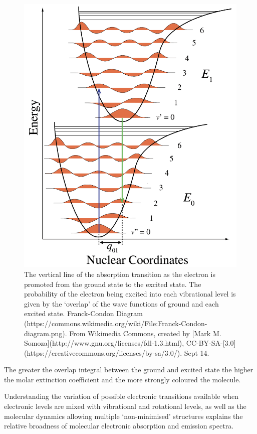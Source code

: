 \documentclass[
]{book}
\begin{document}
\begin{figure}

{\centering \includegraphics[width=0.6\linewidth]{images/FrankCondon} 

}

\caption{The vertical line of the absorption transition as the electron is promoted from the ground state to the excited state. The probability of the electron being excited into each vibrational level is given by the ‘overlap’ of the wave functions of ground and each excited state. Franck-Condon Diagram  (https://commons.wikimedia.org/wiki/File:Franck-Condon-diagram.png). From Wikimedia Commons, created by [Mark M. Somoza](http://www.gnu.org/licenses/fdl-1.3.html), CC-BY-SA-[3.0](https://creativecommons.org/licenses/by-sa/3.0/). Sept 14. }\label{fig:FrankCondon}
\end{figure}

The greater the overlap integral between the ground and excited state the higher the molar extinction coefficient and the more strongly coloured the molecule.

Understanding the variation of possible electronic transitions available when electronic levels are mixed with vibrational and rotational levels, as well as the molecular dynamics allowing multiple `non-minimised' structures explains the relative broadness of molecular electronic absorption and emission spectra.
\end{document}

